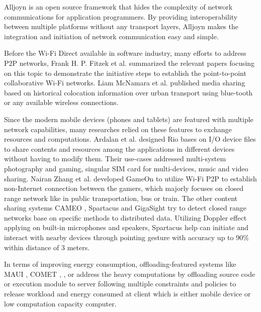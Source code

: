 \documentclass{sig-alternate}[10pt]
\begin{document}
\begin{CCSXML}
Alljoyn \cite{alljoyn} is an open source framework that hides the complexity of network communications for application programmers. By providing interoperability between multiple platforms without any transport layers, Alljoyn makes the integration and initiation of network communication easy and simple. 

Before the Wi-Fi Direct available in software industry, many efforts to address P2P networks, Frank H. P. Fitzek et al. \cite{m_p2p_tutor} summarized the relevant papers focusing on this topic to demonstrate the initiative steps to establish the point-to-point collaborative Wi-Fi networks. Liam McNamara et al. published \cite{media_share} media sharing based on historical colocation information over urban transport using blue-tooth or any available wireless connections.

Since the modern mobile devices (phones and tablets) are featured with multiple network capabilities, many researches relied on these features to exchange resources and computations. Ardalan et al. designed Rio \cite{rio} bases on I/O device files to share contents and resources among the applications in different devices without having to modify them. Their use-cases addressed multi-system photography and gaming, singular SIM card for multi-devices, music and video sharing. Nairan Zhang et al. developed GameOn \cite{gameon} to utilize Wi-Fi P2P to establish non-Internet connection between the gamers, which majorly focuses on closed range network like in public transportation, bus or train. The other content sharing systems CAMEO \cite{cameo}, Spartacus \cite{spartacus} and GigaSight \cite{crowd-sourcing} try to detect closed range networks base on specific methods to distributed data. Utilizing Doppler effect applying on built-in microphones and speakers, Spartacus help can initiate and interact with nearby devices through pointing gesture with accuracy up to 90\% within distance of 3 meters.

In terms of improving energy consumption, offloading-featured systems like MAUI \cite{maui}, COMET \cite{comet}, \cite{kwon+:mobilesoft15}, \cite{mobile-cloud-middleware} or \cite{fuzzy-engine} address the heavy computations by offloading source code or execution module to server following multiple constraints and policies to release workload and energy consumed at client which is either mobile device or low computation capacity computer. 


\end{CCSXML}
\end{document}
